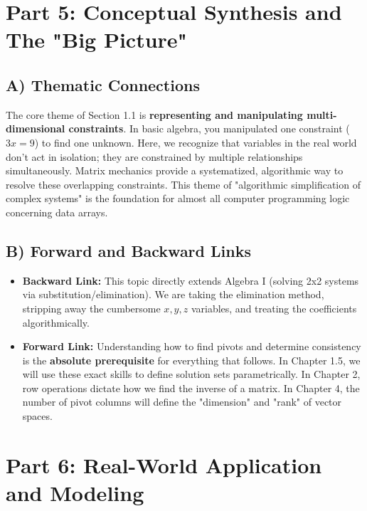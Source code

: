 \documentclass[11pt]{article}
\begin{document}
\newpage
\section{Part 5: Conceptual Synthesis and The "Big Picture"}

\subsection{A) Thematic Connections}
The core theme of Section 1.1 is \textbf{representing and manipulating multi-dimensional constraints}. In basic algebra, you manipulated one constraint ($3x = 9$) to find one unknown. Here, we recognize that variables in the real world don't act in isolation; they are constrained by multiple relationships simultaneously. Matrix mechanics provide a systematized, algorithmic way to resolve these overlapping constraints. This theme of "algorithmic simplification of complex systems" is the foundation for almost all computer programming logic concerning data arrays.

\subsection{B) Forward and Backward Links}
\begin{itemize}
    \item \textbf{Backward Link:} This topic directly extends Algebra I (solving 2x2 systems via substitution/elimination). We are taking the elimination method, stripping away the cumbersome $x, y, z$ variables, and treating the coefficients algorithmically.
    \item \textbf{Forward Link:} Understanding how to find pivots and determine consistency is the \textbf{absolute prerequisite} for everything that follows. In Chapter 1.5, we will use these exact skills to define solution sets parametrically. In Chapter 2, row operations dictate how we find the inverse of a matrix. In Chapter 4, the number of pivot columns will define the "dimension" and "rank" of vector spaces.
\end{itemize}


\newpage
\section{Part 6: Real-World Application and Modeling}
\end{document}
